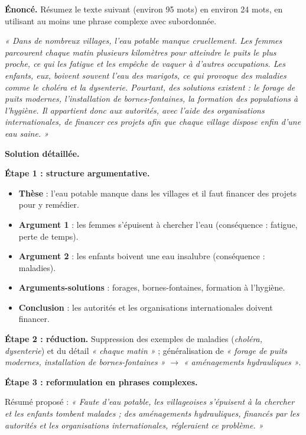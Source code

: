 \documentclass[11pt]{article}
\begin{document}
\begin{exoresolu}
\textbf{Énoncé.} Résumez le texte suivant (environ 95 mots) en environ 24 mots, en utilisant au moins une phrase complexe avec subordonnée.

\emph{« Dans de nombreux villages, l'eau potable manque cruellement. Les femmes parcourent chaque matin plusieurs kilomètres pour atteindre le puits le plus proche, ce qui les fatigue et les empêche de vaquer à d'autres occupations. Les enfants, eux, boivent souvent l'eau des marigots, ce qui provoque des maladies comme le choléra et la dysenterie. Pourtant, des solutions existent : le forage de puits modernes, l'installation de bornes-fontaines, la formation des populations à l'hygiène. Il appartient donc aux autorités, avec l'aide des organisations internationales, de financer ces projets afin que chaque village dispose enfin d'une eau saine. »}

\tcblower
\textbf{Solution détaillée.}

\textbf{Étape 1 : structure argumentative.}
\begin{itemize}
\item \textbf{Thèse} : l'eau potable manque dans les villages et il faut financer des projets pour y remédier.
\item \textbf{Argument 1} : les femmes s'épuisent à chercher l'eau (conséquence : fatigue, perte de temps).
\item \textbf{Argument 2} : les enfants boivent une eau insalubre (conséquence : maladies).
\item \textbf{Arguments-solutions} : forages, bornes-fontaines, formation à l'hygiène.
\item \textbf{Conclusion} : les autorités et les organisations internationales doivent financer.
\end{itemize}

\textbf{Étape 2 : réduction.} Suppression des exemples de maladies (\emph{choléra, dysenterie}) et du détail \emph{« chaque matin »} ; généralisation de \emph{« forage de puits modernes, installation de bornes-fontaines »} $\rightarrow$ \emph{« aménagements hydrauliques »}.

\textbf{Étape 3 : reformulation en phrases complexes.}

Résumé proposé : \emph{« Faute d'eau potable, les villageoises s'épuisent à la chercher et les enfants tombent malades ; des aménagements hydrauliques, financés par les autorités et les organisations internationales, régleraient ce problème. »}


\end{exoresolu}
\end{document}
